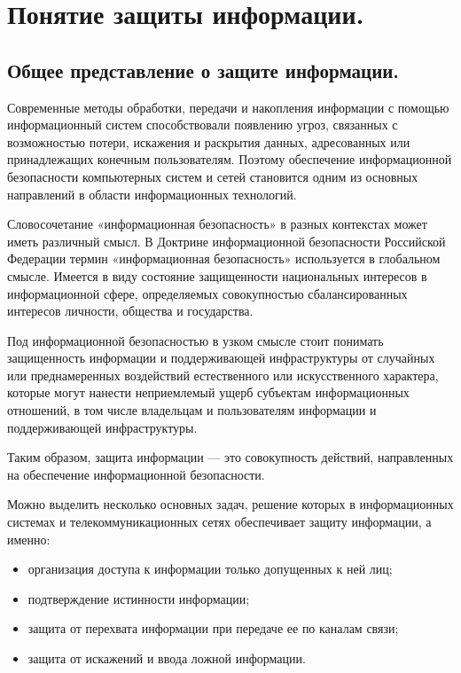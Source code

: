 \section{Понятие защиты информации.}
\subsection{Общее представление о защите информации.}
Современные методы обработки, передачи и накопления информации с помощью информационный систем способствовали 
появлению угроз, связанных с возможностью потери, искажения и раскрытия данных, адресованных или принадлежащих 
конечным пользователям. Поэтому обеспечение информационной безопасности компьютерных систем и сетей становится 
одним из основных направлений в области информационных технологий.

Словосочетание «информационная безопасность» в разных контекстах может иметь различный смысл. В Доктрине информационной
безопасности Российской Федерации термин «информационная безопасность» используется в глобальном смысле. Имеется в виду 
состояние защищенности национальных интересов в информационной сфере, определяемых совокупностью сбалансированных интересов 
личности, общества и государства. 

Под информационной безопасностью в узком смысле стоит понимать защищенность информации и поддерживающей инфраструктуры от 
случайных или преднамеренных воздействий естественного или искусственного характера, которые могут нанести неприемлемый ущерб 
субъектам информационных отношений, в том числе владельцам и пользователям информации и поддерживающей инфраструктуры. 

Таким образом, защита информации — это совокупность действий, направленных на обеспечение информационной безопасности. 

Можно выделить несколько основных задач, решение которых в информационных системах и телекоммуникационных сетях обеспечивает 
защиту информации, а именно:
\begin{itemize}
    \item организация доступа к информации только допущенных к ней лиц;
    \item подтверждение истинности информации;
    \item защита от перехвата информации при передаче ее по каналам связи;
    \item защита от искажений и ввода ложной информации.
\end{itemize}

